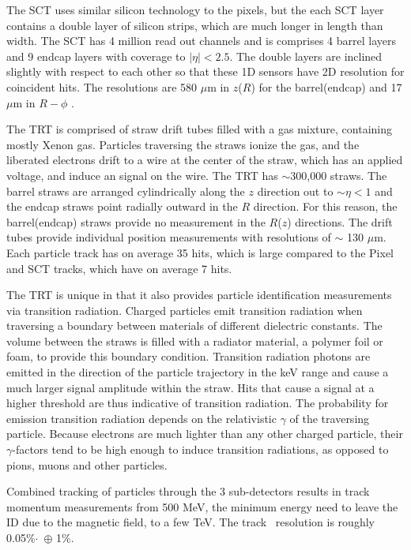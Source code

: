 The SCT uses similar silicon technology to the pixels, but the each SCT layer contains a double layer of silicon strips, which are much longer in length than width. The SCT has 4 million read out channels and is comprises 4 barrel layers and 9 endcap layers with coverage to $|\eta| < 2.5$. The double layers are inclined slightly with respect to each other so that these 1D sensors have 2D resolution for coincident hits. The resolutions are 580 $\mu$m in $z$($R$) for the barrel(endcap) and 17 $\mu$m in $R-\phi$ .

The TRT is comprised of straw drift tubes filled with a gas mixture, containing mostly Xenon gas. Particles traversing the straws ionize the gas, and the liberated electrons drift to a wire at the center of the straw, which has an applied voltage, and induce an signal on the wire. The TRT has $\sim$300,000 straws. The barrel straws are arranged cylindrically along the $z$ direction out to $\sim \eta < 1$ and the endcap straws point radially outward in the $R$ direction. For this reason, the barrel(endcap) straws provide no measurement in the $R$($z$) directions. The drift tubes provide individual position measurements with resolutions of $\sim$ 130 $\mu$m. Each particle track has on average 35 hits, which is large compared to the Pixel and SCT tracks, which have on average 7 hits. 

The TRT is unique in that it also provides particle identification measurements via transition radiation. Charged particles emit transition radiation when traversing a boundary between materials of different dielectric constants. The volume between the straws is filled with a radiator material, a polymer foil or foam, to provide this boundary condition. Transition radiation photons are emitted in the direction of the particle trajectory in the keV range and cause a much larger signal amplitude within the straw. Hits that cause a signal at a higher threshold are thus indicative of transition radiation.  The probability for emission transition radiation depends on the relativistic $\gamma$ of the traversing particle. Because electrons are much lighter than any other charged particle, their $\gamma$-factors tend to be high enough to induce transition radiations, as opposed to pions, muons and other particles. 

Combined tracking of particles through the 3 sub-detectors results in track momentum measurements from 500 MeV, the minimum energy need to leave the ID due to the magnetic field, to a few TeV. The track \pt\ resolution is roughly 0.05\%$\cdot$\pt\ $\oplus$ 1\%.  

